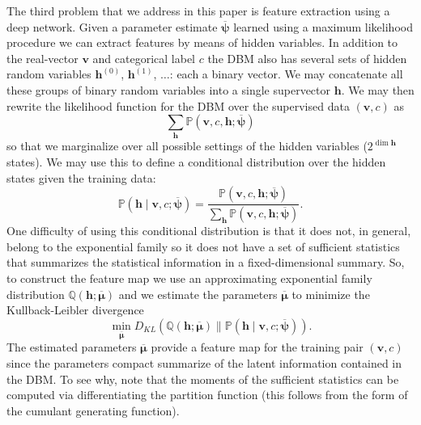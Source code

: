 \documentclass{article} %
\begin{document}
The third problem that we address in this paper is feature extraction
using a deep network.  Given a parameter estimate
$\overline{\boldsymbol{\psi}}$ learned using a maximum likelihood
procedure we can extract features by means of hidden variables.  In
addition to the real-vector $\mathbf{v}$ and categorical label $c$ the
DBM also has several sets of hidden random variables
$\mathbf{h}^{(0)}$, $\mathbf{h}^{(1)}$, $\ldots$: each a binary
vector. We may concatenate all these groups of binary random variables
into a single supervector $\mathbf{h}$.  We may then rewrite the
likelihood function for the DBM over the supervised data
$(\mathbf{v},c)$ as
\begin{equation}
\sum_{\mathbf{h}}\mathbb{P}(\mathbf{v},c, \mathbf{h} ; \overline{\boldsymbol{\psi}})
\end{equation}
so that we marginalize over all possible settings of the hidden variables ($2^{\dim \mathbf{h}}$ states).  We may use this
to define a conditional distribution over the hidden states given the training data:
\begin{equation}
\mathbb{P}(\mathbf{h}\mid \mathbf{v},c ; \overline{\boldsymbol{\psi}}) = \frac{\mathbb{P}(\mathbf{v},c, \mathbf{h} ; \overline{\boldsymbol{\psi}})}{\sum_{\mathbf{h}} \mathbb{P}(\mathbf{v},c, \mathbf{h} ; \overline{\boldsymbol{\psi}})}.
\end{equation}
One difficulty of using this conditional distribution is that it does not, in general, belong to the exponential family so it does not
have a set of sufficient statistics that summarizes the statistical information in a fixed-dimensional summary.
So, to construct the feature map we use an approximating exponential family distribution $\mathbb{Q}(\mathbf{h}; \overline{\boldsymbol{\mu}})$
and we estimate the parameters $\overline{\boldsymbol{\mu}}$ to minimize the Kullback-Leibler divergence
\begin{equation}
\min_{\overline{\boldsymbol{\mu}}} D_{KL}(\mathbb{Q}(\mathbf{h}; \overline{\boldsymbol{\mu}}) \| \mathbb{P}(\mathbf{h}\mid \mathbf{v},c ; \overline{\boldsymbol{\psi}})).
\end{equation}
The estimated parameters $\overline{\boldsymbol{\mu}}$ provide a feature map for the training pair $(\mathbf{v},c)$ since
the parameters compact summarize of the latent information contained in the DBM.  To see why, note that the moments of the 
sufficient statistics can be computed via differentiating the partition function (this follows from the form of the cumulant generating function).
\end{document}
